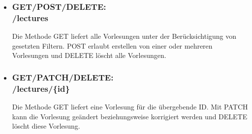 \begin{itemize}
\item \subsubsection{GET/POST/DELETE:\\ /lectures} 
Die Methode GET liefert alle Vorlesungen unter der Berücksichtigung von gesetzten Filtern. POST erlaubt erstellen von einer oder mehreren Vorlesungen und DELETE löscht alle Vorlesungen.

\item \subsubsection{GET/PATCH/DELETE:\\ /lectures/\{id\}} 
Die Methode GET liefert eine Vorlesung für die übergebende ID. Mit PATCH kann die Vorlesung geändert beziehungsweise korrigiert werden und DELETE löscht diese Vorlesung.


\end{itemize}
